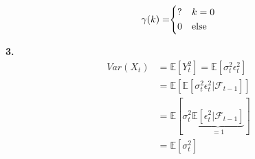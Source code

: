 \begin{footnotesize}
\begin{subequations}
\begin{equation}
\begin{array}{r@{}l}
\gamma(k) = & \left\{
\begin{aligned}
    & ?  &&k=0 \nonumber \\
    & 0 && \text{else} \nonumber
\end{aligned}
\right.
\end{array}
\end{equation}
\end{subequations}

\textbf{3.}
\begin{align*}
    Var(X_t)&= \mathbb{E}[Y_t^2] = \mathbb{E}[\sigma_t^2 \epsilon_t^2]\\
    &=\mathbb{E}[\mathbb{E}[\sigma_t^2 \epsilon_t^2| \mathcal{F}_{t-1}]]\\
    &= \mathbb{E}[\sigma_t^2 \underbrace{\mathbb{E}[\epsilon_t^2 | \mathcal{F}_{t-1}]}_{=1}] \\
    &= \mathbb{E}[\sigma_t^2]
\end{align*}



\end{footnotesize}
